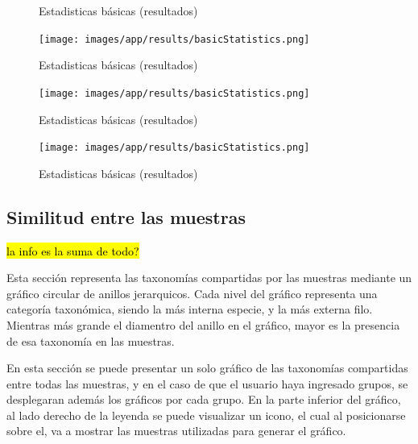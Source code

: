 \begin{itemize}
\begin{figure}[H]
    \caption{Estadisticas básicas (resultados)}
    \label{fig:app-results-taxonomicAssig-sample-nreads}
\end{figure}

\begin{figure}[H]
    \texttt{[image: images/app/results/basicStatistics.png]}

    \caption{Estadisticas básicas (resultados)}
    \label{fig:app-results-taxonomicAssig-sample-perc}
\end{figure}

\begin{figure}[H]
    \texttt{[image: images/app/results/basicStatistics.png]}

    \caption{Estadisticas básicas (resultados)}
    \label{fig:app-results-taxonomicAssig-group-nreads}
\end{figure}

\begin{figure}[H]
    \texttt{[image: images/app/results/basicStatistics.png]}

    \caption{Estadisticas básicas (resultados)}
    \label{fig:app-results-taxonomicAssig-group-perc}
\end{figure}
\subsection{Similitud entre las muestras}
\hl{la info es la suma de todo?}


Esta sección representa las taxonomías compartidas por las muestras mediante un gráfico circular de anillos jerarquicos. 
Cada nivel del gráfico representa una categoría taxonómica, siendo la más interna especie, y la más externa filo.
Mientras más grande el diamentro del anillo en el gráfico, mayor es la presencia de esa taxonomía en las muestras.

En esta sección se puede presentar un solo gráfico de las taxonomías compartidas entre todas las muestras, y en el caso de que el usuario haya ingresado grupos, se desplegaran además los gráficos por cada grupo.
En la parte inferior del gráfico, al lado derecho de la leyenda se puede visualizar un icono, el cual al posicionarse sobre el, va a mostrar las muestras utilizadas para generar el gráfico.


\end{itemize}
